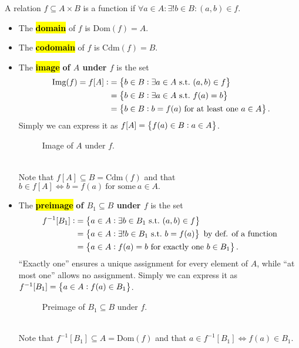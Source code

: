 \documentclass[11pt,openany]{article}
\begin{document}
\begin{remark*}
	A relation $f\subseteq A\times B$ is a function if $\boxed{\forall a\in A:\exists! b\in B:(a,b)\in f.}$
	\begin{itemize}
		\item The \hl{\textbf{domain}} of $f$ is $\text{Dom}(f)=A$.
		\item The \hl{\textbf{codomain}} of $f$ is $\text{Cdm}(f)=B$.
		\newpage
		\item The \hl{\textbf{image}} \textbf{of $A$ under $f$} is the set \begin{align*}\
			\img{f}=f[A]:&=\set{b\in B:\exists a \in A\ \text{s.t.}\ (a,b)\in f}\\
			&=\set{b\in B:\exists a \in A\ \text{s.t.}\ f(a)=b}\\
			&=\set{b\in B: b = f(a)\ \text{for at least one}\ a\in A}.
		\end{align*} Simply we can express it as $f[A]=\set{f(a)\in B:a\in A}$. 
		\begin{figure}[h!]\centering
			
			\caption{Image of $A$ under $f$.}
		\end{figure}\\
		Note that $f[A]\subseteq B=\text{Cdm}(f)$ and that $
			b\in f[A]\iff b=f(a)\ \text{for some}\ a\in A.$\vfill
		\item The \hl{\textbf{preimage}} \textbf{of $B_1\subseteq B$ under $f$} is the set \begin{align*}
			f^{-1}[B_1]:&=\set{a\in A:\exists b \in B_1\ \text{s.t.}\ (a,b)\in f}\\
			&=\set{a\in A:\exists! b \in B_1\ \text{s.t.}\ b=f(a)}\ \text{by def. of a function}\\
			&=\set{a\in A:f(a)=b\ \text{for exactly one}\ b\in B_1}.
		\end{align*} ``Exactly one'' ensures a unique assignment for every element of $A$, while ``at most one'' allows no assignment. Simply we can express it as $f^{-1}[B_1]=\set{a\in A:f(a)\in B_1}$.
		\begin{figure}[h!]\centering
				
				\caption{Preimage of $B_1\subseteq B$ under $f$.}
			\end{figure}\\
		Note that $f^{-1}[B_1]\subseteq A=\text{Dom}(f)$ and that $a\in f^{-1}[B_1]\iff f(a)\in B_1.$
	\end{itemize}
\end{remark*}
\end{document}
